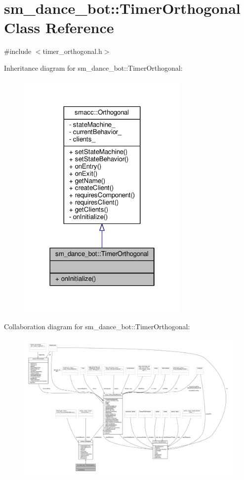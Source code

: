 \hypertarget{classsm__dance__bot_1_1TimerOrthogonal}{}\section{sm\+\_\+dance\+\_\+bot\+:\+:Timer\+Orthogonal Class Reference}
\label{classsm__dance__bot_1_1TimerOrthogonal}


{\ttfamily \#include $<$timer\+\_\+orthogonal.\+h$>$}



Inheritance diagram for sm\+\_\+dance\+\_\+bot\+:\+:Timer\+Orthogonal\+:
\nopagebreak
\begin{figure}[H]
\begin{center}
\leavevmode
\includegraphics[width=238pt]{classsm__dance__bot_1_1TimerOrthogonal__inherit__graph}
\end{center}
\end{figure}


Collaboration diagram for sm\+\_\+dance\+\_\+bot\+:\+:Timer\+Orthogonal\+:
\nopagebreak
\begin{figure}[H]
\begin{center}
\leavevmode
\includegraphics[width=350pt]{classsm__dance__bot_1_1TimerOrthogonal__coll__graph}
\end{center}
\end{figure}
